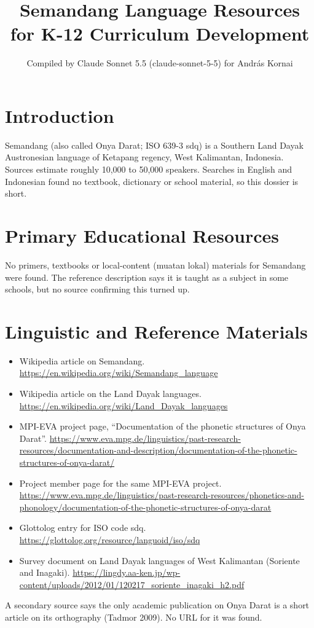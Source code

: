 \documentclass[12pt]{article}
\title{Semandang Language Resources for K-12 Curriculum Development}
\author{Compiled by Claude Sonnet 5.5 (claude-sonnet-5-5) for Andr\'as Kornai}
\date{}
\begin{document}
\maketitle

\section{Introduction}
Semandang (also called Onya Darat; ISO 639-3 sdq) is a Southern Land Dayak Austronesian language of Ketapang regency, West Kalimantan, Indonesia. Sources estimate roughly 10,000 to 50,000 speakers. Searches in English and Indonesian found no textbook, dictionary or school material, so this dossier is short.

\section{Primary Educational Resources}
No primers, textbooks or local-content (muatan lokal) materials for Semandang were found. The reference description says it is taught as a subject in some schools, but no source confirming this turned up.

\section{Linguistic and Reference Materials}
\begin{itemize}
\item Wikipedia article on Semandang. \url{https://en.wikipedia.org/wiki/Semandang_language}
\item Wikipedia article on the Land Dayak languages. \url{https://en.wikipedia.org/wiki/Land_Dayak_languages}
\item MPI-EVA project page, ``Documentation of the phonetic structures of Onya Darat''. \url{https://www.eva.mpg.de/linguistics/past-research-resources/documentation-and-description/documentation-of-the-phonetic-structures-of-onya-darat/}
\item Project member page for the same MPI-EVA project. \url{https://www.eva.mpg.de/linguistics/past-research-resources/phonetics-and-phonology/documentation-of-the-phonetic-structures-of-onya-darat}
\item Glottolog entry for ISO code sdq. \url{https://glottolog.org/resource/languoid/iso/sdq}
\item Survey document on Land Dayak languages of West Kalimantan (Soriente and Inagaki). \url{https://lingdy.aa-ken.jp/wp-content/uploads/2012/01/120217_soriente_inagaki_h2.pdf}
\end{itemize}
A secondary source says the only academic publication on Onya Darat is a short article on its orthography (Tadmor 2009). No URL for it was found.
\end{document}
